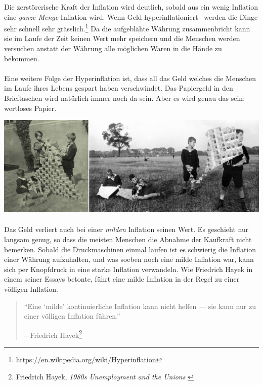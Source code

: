 Die zerstörerische Kraft der Inflation wird deutlich, sobald aus ein wenig
Inflation eine \textit{ganze Menge} Inflation wird. Wenn Geld
hyperinflationiert~\cite{wiki:hyperinflation} werden die Dinge sehr schnell sehr
grässlich.\footnote{\url{https://en.wikipedia.org/wiki/Hyperinflation}} Da die
aufgeblähte Währung zusammenbricht kann sie im Laufe der Zeit keinen Wert mehr
speichern und die Menschen werden versuchen anstatt der Währung alle
möglichen Waren in die Hände zu bekommen.

\paragraph{}
Eine weitere Folge der Hyperinflation ist, dass all das Geld welches die
Menschen im Laufe ihres Lebens gespart haben verschwindet. Das Papiergeld in den
Brieftaschen wird natürlich immer noch da sein. Aber es wird genau das sein:
wertloses Papier.

\begin{center}
  \includegraphics[width=\textwidth]{assets/images/children-playing-with-money.png}
  \label{fig:children-playing-with-money}
\end{center}

\paragraph{}
Das Geld verliert auch bei einer \textit{milden} Inflation seinen Wert. Es
geschieht nur langsam genug, so dass die meisten Menschen die Abnahme der
Kaufkraft nicht bemerken. Sobald die Druckmaschinen einmal laufen ist es
schwierig die Inflation einer Währung aufzuhalten, und was soeben noch eine
milde Inflation war, kann sich per Knopfdruck in eine starke Inflation
verwandeln. Wie Friedrich Hayek in einem seiner Essays betonte, führt eine milde
Inflation in der Regel zu einer völligen Inflation.

\begin{quotation}\begin{samepage}
\enquote{Eine \enquote{milde} kontinuierliche Inflation kann nicht helfen — sie
kann nur zu einer völligen Inflation führen.}
\begin{flushright} -- Friedrich Hayek\footnote{Friedrich Hayek, \textit{1980s
Unemployment and the Unions} \cite{hayek-inflation}}
\end{flushright}\end{samepage}\end{quotation}

